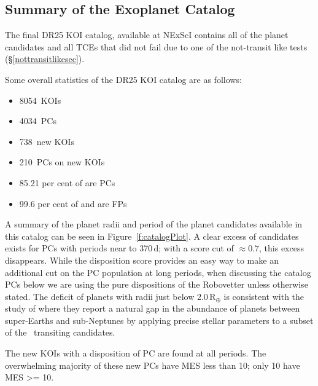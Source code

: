 \def \nkois {8054}
\def \ncand {4034}
\def \newkois {738}
\def \newcand {210}
\def \completeness {85.21}
\def \reliability {97.14}
\def \effectiveness {99.6}

\subsection{Summary of the Exoplanet Catalog}

The final DR25 KOI catalog, available at NExScI contains all of the planet candidates and all TCEs that did not fail due to one of the not-transit like tests (\S\ref{nottransitlikesec}). 


Some overall statistics of the DR25 KOI catalog are as follows:
\begin{itemize}
    \item \nkois{}~KOIs
    \item \ncand{}~PCs
    \item \newkois{}~new KOIs
    \item \newcand{}~PCs on new KOIs
    \item \completeness{} per cent of  are PCs
    \item \effectiveness{} per cent of  and  are FPs
\end{itemize}

A summary of the planet radii and period of the planet candidates available in this catalog can be seen in Figure~\ref{f:catalogPlot}. A clear excess of candidates exists for PCs with periods near to 370\,d;  with a score cut of $\approx0.7$, this excess disappears. While the disposition score provides an easy way to make an additional cut on the PC population at long periods, when discussing the catalog PCs below we are using the pure dispositions of the Robovetter unless otherwise stated. The deficit of planets with radii just below 2.0\,R$_{\oplus}$ is consistent with the study of \citet{Fulton2017} where they report a natural gap in the abundance of planets between super-Earths and sub-Neptunes by applying precise stellar parameters to a subset of the \kepler\ transiting candidates. 

The new KOIs with a disposition of PC are found at all periods. The overwhelming majority of these new PCs have MES less than 10; only 10 have MES >= 10. 

